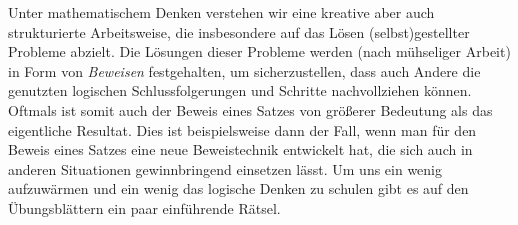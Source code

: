 Unter mathematischem Denken verstehen wir eine kreative aber auch strukturierte Arbeitsweise, die insbesondere
auf das Lösen (selbst)gestellter Probleme abzielt. Die Lösungen dieser Probleme werden (nach mühseliger Arbeit) in Form 
von \textit{Beweisen} festgehalten, um sicherzustellen, dass auch Andere die genutzten logischen Schlussfolgerungen und Schritte nachvollziehen können.
Oftmals ist somit auch der Beweis eines Satzes von größerer Bedeutung als das eigentliche Resultat. Dies ist beispielsweise dann der Fall, wenn man
für den Beweis eines Satzes eine neue Beweistechnik entwickelt hat, die sich auch in anderen Situationen gewinnbringend einsetzen lässt. 
\newline 
Um uns ein wenig aufzuwärmen und ein wenig das logische Denken zu schulen gibt es auf den Übungsblättern ein paar einführende Rätsel. 
